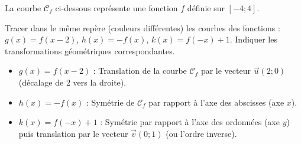 \documentclass[11pt]{article}
\begin{document}
\begin{exercice}
La courbe $\mathcal{C}_f$ ci-dessous représente une fonction $f$ définie sur $[-4;4]$.
\begin{center}
\end{center}
Tracer dans le même repère (couleurs différentes) les courbes des fonctions :
$g(x) = f(x-2)$, \quad $h(x) = -f(x)$, \quad $k(x) = f(-x) + 1$.
Indiquer les transformations géométriques correspondantes.
\end{exercice}

\begin{corrige}
\begin{itemize}
    \item $g(x) = f(x-2)$ : Translation de la courbe $\mathcal{C}_f$ par le vecteur $\vec{u}(2;0)$ (décalage de 2 vers la droite).
    \item $h(x) = -f(x)$ : Symétrie de $\mathcal{C}_f$ par rapport à l'axe des abscisses (axe $x$).
    \item $k(x) = f(-x) + 1$ : Symétrie par rapport à l'axe des ordonnées (axe $y$) puis translation par le vecteur $\vec{v}(0;1)$ (ou l'ordre inverse).
\end{itemize}
\end{corrige}
\end{document}
